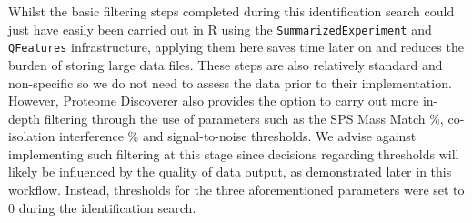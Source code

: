 \documentclass[9pt,a4paper,]{extarticle}
\begin{document}
Whilst the basic filtering steps completed during this identification search
could just have easily been carried out in R using the \texttt{SummarizedExperiment}
and \texttt{QFeatures} infrastructure, applying them here saves time later on and
reduces the burden of storing large data files. These steps are also relatively
standard and non-specific so we do not need to assess the data prior to their
implementation. However, Proteome Discoverer also provides the option to carry
out more in-depth filtering through the use of parameters such as the SPS Mass
Match \%, co-isolation interference \% and signal-to-noise thresholds. We advise
against implementing such filtering at this stage since decisions regarding
thresholds will likely be influenced by the quality of data output, as
demonstrated later in this workflow. Instead, thresholds for the three
aforementioned parameters were set to 0 during the identification search.

{\small}
\end{document}

